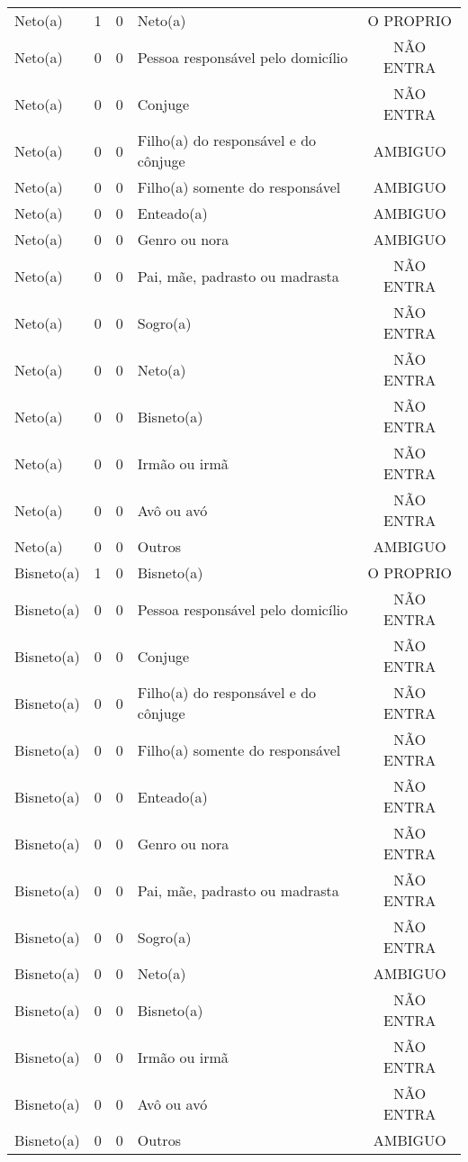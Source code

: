 \documentclass[
	12pt,				%
	openright,			%
	twoside,			%
	a4paper,			%
	english,			%
	french,				%
	spanish,			%
	brazil				%
	]{abntex2}
\begin{document}
\begin{anexosenv}
\begin{longtable}{@{}lcclc@{}}
				Neto(a) & 1 & 0 & Neto(a) & O PROPRIO \\
				Neto(a) & 0 & 0 & Pessoa responsável pelo domicílio & NÃO ENTRA \\
				Neto(a) & 0 & 0 & Conjuge & NÃO ENTRA \\
				Neto(a) & 0 & 0 & Filho(a) do responsável e do cônjuge & AMBIGUO \\
				Neto(a) & 0 & 0 & Filho(a) somente do responsável & AMBIGUO \\
				Neto(a) & 0 & 0 & Enteado(a) & AMBIGUO \\
				Neto(a) & 0 & 0 & Genro ou nora & AMBIGUO \\
				Neto(a) & 0 & 0 & Pai, mãe, padrasto ou madrasta & NÃO ENTRA \\
				Neto(a) & 0 & 0 & Sogro(a) & NÃO ENTRA \\
				Neto(a) & 0 & 0 & Neto(a) & NÃO ENTRA \\
				Neto(a) & 0 & 0 & Bisneto(a) & NÃO ENTRA \\
				Neto(a) & 0 & 0 & Irmão ou irmã & NÃO ENTRA \\
				Neto(a) & 0 & 0 & Avô ou avó & NÃO ENTRA \\
				Neto(a) & 0 & 0 & Outros & AMBIGUO \\
				Bisneto(a) & 1 & 0 & Bisneto(a) & O PROPRIO \\
				Bisneto(a) & 0 & 0 & Pessoa responsável pelo domicílio & NÃO ENTRA \\
				Bisneto(a) & 0 & 0 & Conjuge & NÃO ENTRA \\
				Bisneto(a) & 0 & 0 & Filho(a) do responsável e do cônjuge & NÃO ENTRA \\
				Bisneto(a) & 0 & 0 & Filho(a) somente do responsável & NÃO ENTRA \\
				Bisneto(a) & 0 & 0 & Enteado(a) & NÃO ENTRA \\
				Bisneto(a) & 0 & 0 & Genro ou nora & NÃO ENTRA \\
				Bisneto(a) & 0 & 0 & Pai, mãe, padrasto ou madrasta & NÃO ENTRA \\
				Bisneto(a) & 0 & 0 & Sogro(a) & NÃO ENTRA \\
				Bisneto(a) & 0 & 0 & Neto(a) & AMBIGUO \\
				Bisneto(a) & 0 & 0 & Bisneto(a) & NÃO ENTRA \\
				Bisneto(a) & 0 & 0 & Irmão ou irmã & NÃO ENTRA \\
				Bisneto(a) & 0 & 0 & Avô ou avó & NÃO ENTRA \\
				Bisneto(a) & 0 & 0 & Outros & AMBIGUO \\

\end{longtable}
\end{anexosenv}
\end{document}
